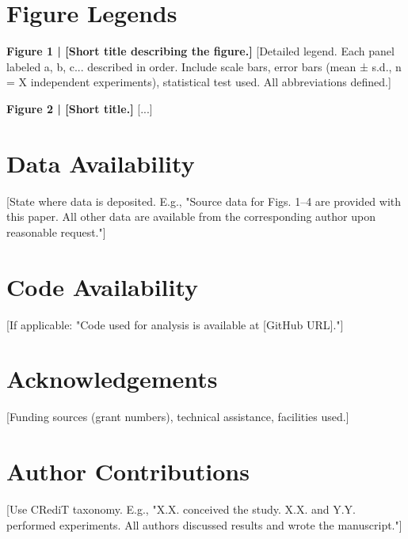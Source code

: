 \documentclass[9pt,twoside,lineno]{article}
\begin{document}
\section*{Figure Legends}

\noindent\textbf{Figure 1 | [Short title describing the figure.]}
[Detailed legend. Each panel labeled a, b, c... described in order.
Include scale bars, error bars (mean ± s.d., n = X independent experiments),
statistical test used. All abbreviations defined.]

\noindent\textbf{Figure 2 | [Short title.]}
[...]



\section*{Data Availability}
[State where data is deposited. E.g., "Source data for Figs. 1–4 are provided 
with this paper. All other data are available from the corresponding author 
upon reasonable request."]

\section*{Code Availability}
[If applicable: "Code used for analysis is available at [GitHub URL]."]

\section*{Acknowledgements}
[Funding sources (grant numbers), technical assistance, facilities used.]

\section*{Author Contributions}
[Use CRediT taxonomy. E.g., "X.X. conceived the study. X.X. and Y.Y. performed experiments. All authors discussed results and wrote the manuscript."]
\end{document}
